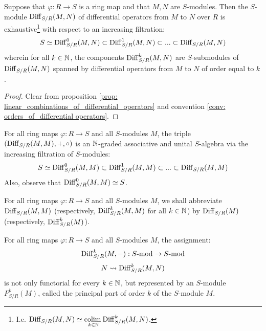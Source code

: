             \begin{proposition} \label{prop: filtering_differential_operators_by_orders}
                Suppose that $\varphi:  R \to S$ is a ring map and that $M, N$ are $S$-modules. Then the $S$-module $\mathrm{Diff}_{S/R}(M, N)$ of differential operators from $M$ to $N$ over $R$ is exhaustive\footnote{I.e. $\mathrm{Diff}_{S/R}(M, N) \simeq \underset{k \in \mathbb{N}}{\operatorname{colim} \:} \mathrm{Diff}_{S/R}^k(M, N)$.} with respect to an increasing filtration:
                    $$S \simeq \mathrm{Diff}_{S/R}^0(M, N) \subset \mathrm{Diff}_{S/R}^1(M, N) \subset ... \subset \mathrm{Diff}_{S/R}(M, N)$$
                wherein for all $k \in \mathbb{N}$, the components $\mathrm{Diff}_{S/R}^k(M, N)$ are $S$-submodules of $\mathrm{Diff}_{S/R}(M, N)$ spanned by differential operators from $M$ to $N$ of order equal to $k$. 
            \end{proposition}
                \begin{proof}
                    Clear from proposition \ref{prop: linear_combinations_of_differential_operators} and convention \ref{conv: orders_of_differential operators}.
                \end{proof}
            \begin{corollary} \label{coro: rings_of_differential_operators}
                For all ring maps $\varphi: R \to S$ and all $S$-modules $M$, the triple $(\mathrm{Diff}_{S/R}(M, M), +, \circ)$ is an $\mathbb{N}$-graded associative and unital $S$-algebra via the increasing filtration of $S$-modules:
                    $$S \simeq \mathrm{Diff}_{S/R}^0(M, M) \subset \mathrm{Diff}_{S/R}^1(M, M) \subset ... \subset \mathrm{Diff}_{S/R}(M, M)$$
                Also, observe that $\mathrm{Diff}_{S/R}^0(M, M) \simeq S$.
            \end{corollary}
            \begin{convention}
                For all ring maps $\varphi: R \to S$ and all $S$-modules $M$, we shall abbreviate $\mathrm{Diff}_{S/R}(M, M)$ (respectively, $\mathrm{Diff}_{S/R}^k(M, M)$ for all $k \in \mathbb{N}$) by $\mathrm{Diff}_{S/R}(M)$ (respectively, $\mathrm{Diff}_{S/R}^k(M)$).
            \end{convention}
            \begin{proposition} \label{prop: principal_parts}
                For all ring maps $\varphi: R \to S$ and all $S$-modules $M$, the assignment:
                    $$\mathrm{Diff}_{S/R}^k(M, -): S\text{-}\mathrm{mod} \to S\text{-}\mathrm{mod}$$
                    $$N \leadsto \mathrm{Diff}_{S/R}^k(M, N)$$
                is not only functorial for every $k \in \mathbb{N}$, but represented by an $S$-module $P_{S/R}^k(M)$, called the principal part of order $k$ of the $S$-module $M$.
            \end{proposition}
